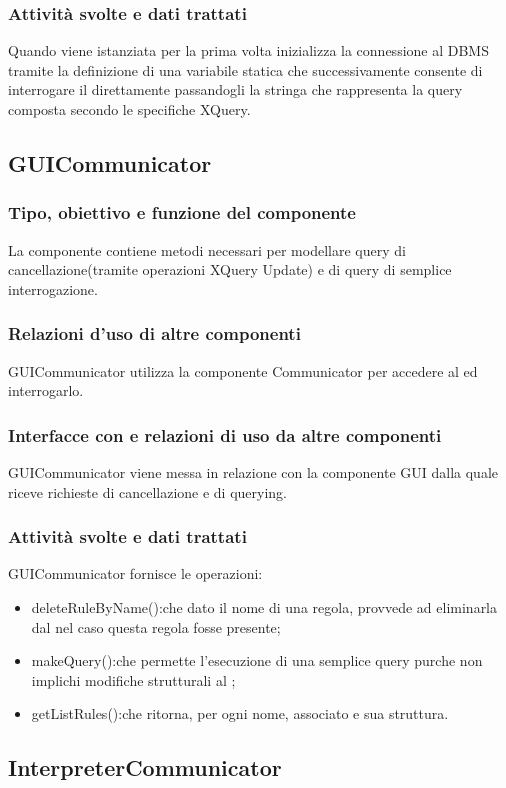 \documentclass[11pt,titlepage,a4paper]{report}
\begin{document}
\subsubsection{Attivit\`a svolte e dati trattati}
Quando viene istanziata per la prima volta inizializza la connessione al DBMS tramite la definizione di una variabile statica che successivamente consente di interrogare il \re direttamente passandogli la stringa che rappresenta la query composta secondo le specifiche XQuery.
%
\subsection{GUICommunicator}
\subsubsection{Tipo, obiettivo e funzione del componente}
La componente contiene metodi necessari per modellare query di cancellazione(tramite operazioni XQuery Update) e di query di semplice interrogazione.
\subsubsection{Relazioni d'uso di altre componenti}
GUICommunicator utilizza la componente Communicator per accedere al \re ed interrogarlo.
\subsubsection{Interfacce con e relazioni di uso da altre componenti}
GUICommunicator viene messa in relazione con la componente GUI dalla quale riceve richieste di cancellazione e di querying.%
\subsubsection{Attivit\`a svolte e dati trattati}
GUICommunicator fornisce le operazioni:
\begin{itemize}
 \item deleteRuleByName():che dato il nome di una regola, provvede ad eliminarla dal \re nel caso questa regola fosse presente;
 \item makeQuery():che permette l'esecuzione di una semplice query purche non implichi modifiche strutturali al \re;
 \item getListRules():che ritorna, per ogni \br nome, \bo associato e sua struttura.
\end{itemize}
\subsection{InterpreterCommunicator}
\end{document}
